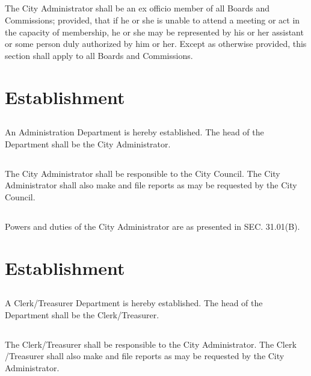\subsection{}
The City Administrator shall be an ex officio member of all Boards and Commissions; provided, that if he or she is unable to attend a meeting or act in the capacity of membership, he or she may be represented by his or her assistant or some person duly authorized by him or her. Except as otherwise provided, this section shall apply to all Boards and Commissions.\\

\setcounter{section}{9}
\section{Establishment}
\subsection{}
An Administration Department is hereby established. The head of the Department shall be the City Administrator.
\subsection{}
The City Administrator shall be responsible to the City Council. The City Administrator shall also make and file reports as may be requested by the City Council.
\subsection{}
Powers and duties of the City Administrator are as presented in SEC. 31.01(B).\\

\setcounter{section}{19}
\section{Establishment}
\subsection{}
A Clerk/Treasurer Department is hereby established. The head of the Department shall be the Clerk/Treasurer.
\subsection{}
The Clerk/Treasurer shall be responsible to the City Administrator. The Clerk /Treasurer shall also make and file reports as may be requested by the City Administrator.\\

